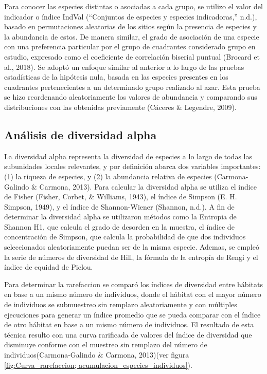 \documentclass[11pt,]{article}
\begin{document}
Para conocer las especies distintas o asociadas a cada grupo, se utilizo
el valor del indicador o índice IndVal (``Conjuntos de especies y
especies indicadoras,'' n.d.), basado en permutaciones aleatorias de los
sitios según la presencia de especies y la abundancia de estos. De
manera similar, el grado de asociación de una especie con una
preferencia particular por el grupo de cuadrantes considerado grupo en
estudio, expresado como el coeficiente de correlación biserial puntual
(Brocard et al., 2018). Se adoptó un enfoque similar al anterior a lo
largo de las pruebas estadísticas de la hipótesis nula, basada en las
especies presentes en los cuadrantes pertenecientes a un determinado
grupo realizado al azar. Esta prueba se hizo reordenando aleatoriamente
los valores de abundancia y comparando sus distribuciones con las
obtenidas previamente (Cáceres \& Legendre, 2009).

\subsection{Análisis de diversidad
alpha}\label{anuxe1lisis-de-diversidad-alpha}

La diversidad alpha representa la diversidad de especies a lo largo de
todas las subunidades locales relevantes, y por definición abarca dos
variables importantes: (1) la riqueza de especies, y (2) la abundancia
relativa de especies (Carmona-Galindo \& Carmona, 2013). Para calcular
la diversidad alpha se utiliza el indice de Fisher (Fisher, Corbet, \&
Williams, 1943), el índice de Simpson (E. H. Simpson, 1949), y el índice
de Shannon-Wiener (Shannon, n.d.). A fin de determinar la diversidad
alpha se utilizaron métodos como la Entropia de Shannon H1, que calcula
el grado de desorden en la muestra, el índice de concentración de
Simpson, que calcula la probabilidad de que dos individuos seleccionados
aleatoriamente puedan ser de la misma especie. Ademas, se empleó la
serie de números de diversidad de Hill, la fórmula de la entropía de
Rengi y el índice de equidad de Pielou.

Para determinar la rarefaccion se comparó los índices de diversidad
entre hábitats en base a un mismo número de individuos, donde el hábitat
con el mayor número de individuos se submuestreo sin remplazo
aleatoriamente y con múltiples ejecuciones para generar un índice
promedio que se pueda comparar con el índice de otro hábitat en base a
un mismo número de individuos. El resultado de esta técnica resulto con
una curva rarificada de valores del índice de diversidad que disminuye
conforme con el muestreo sin remplazo del número de
individuos(Carmona-Galindo \& Carmona, 2013)(ver figura
\ref{fig:Curva_rarefaccion; acumulacion_especies_individuos}).
\end{document}
